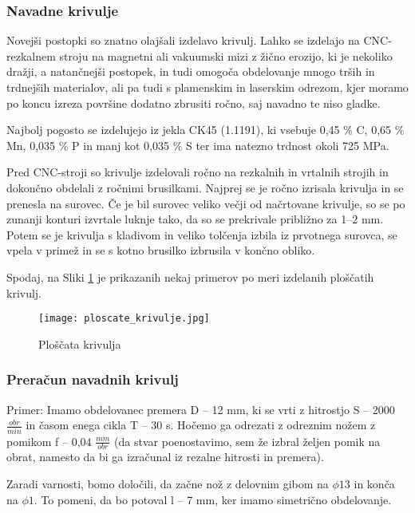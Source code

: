 \subsubsection{Navadne krivulje}
Novejši postopki so znatno olajšali izdelavo krivulj.
Lahko se izdelajo na CNC-rezkalnem stroju na magnetni ali vakuumski mizi
z žično erozijo, ki je nekoliko dražji, a natančnejši postopek, in tudi omogoča
obdelovanje mnogo trših in trdnejših materialov, ali pa tudi s
plamenskim in laserskim odrezom, kjer moramo po koncu izreza površine
dodatno zbrusiti ročno, saj navadno te niso gladke.

Najbolj pogosto se izdelujejo iz jekla CK45 (1.1191), ki vsebuje
0,45 \% C, 0,65 \% Mn, 0,035 \% P in manj kot 0,035 \% S ter ima natezno trdnost okoli 725 MPa. \cite{interna}

Pred CNC-stroji so krivulje izdelovali ročno na rezkalnih in vrtalnih strojih
in dokončno obdelali z ročnimi brusilkami.
Najprej se je ročno izrisala krivulja in se prenesla na surovec.
Če je bil surovec veliko večji od načrtovane krivulje, so se po
zunanji konturi izvrtale luknje tako, da so se prekrivale približno za 1--2 mm. Potem se je krivulja s kladivom in veliko tolčenja izbila iz prvotnega surovca,
se vpela v primež in se s kotno brusilko izbrusila v končno obliko.

Spodaj, na Sliki \ref{ploscate_krivulje} je prikazanih nekaj primerov
po meri izdelanih ploščatih krivulj.

\begin{figure}[H]
	\begin{center}
		\texttt{[image: ploscate\_krivulje.jpg]}
		\caption{Ploščata krivulja
			\cite{lasten}}
		\label{ploscate_krivulje}
	\end{center}
\end{figure}

\subsubsection{Preračun navadnih krivulj}
\label{izracun_krivulj}
Primer: Imamo obdelovanec premera D -- 12 mm, ki se vrti z hitrostjo S -- 2000 \( \frac{obr}{min} \)
in časom enega cikla T -- 30 s. Hočemo ga odrezati z odreznim nožem z pomikom f -- 0,04 \( \frac{mm}{obr} \)
(da stvar poenostavimo, sem že izbral željen pomik na obrat, namesto da bi ga
izračunal iz rezalne hitrosti in premera).

Zaradi varnosti, bomo določili, da začne nož z delovnim gibom
na $\phi 13$ in konča na $\phi 1$. To pomeni, da bo potoval l -- 7 mm, ker
imamo simetrično obdelovanje.

